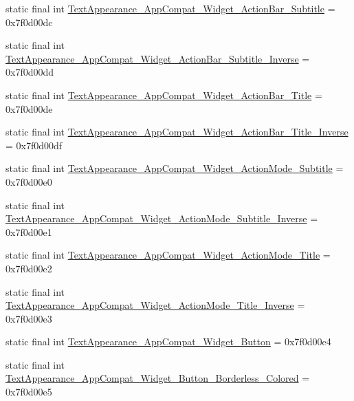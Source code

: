 \begin{DoxyCompactItemize}
\item 
static final int \mbox{\hyperlink{classcom_1_1synnapps_1_1carouselview_1_1_r_1_1style_ac478ef0d31921a8cc947a0f3a59801e9}{Text\+Appearance\+\_\+\+App\+Compat\+\_\+\+Widget\+\_\+\+Action\+Bar\+\_\+\+Subtitle}} = 0x7f0d00dc
\item 
static final int \mbox{\hyperlink{classcom_1_1synnapps_1_1carouselview_1_1_r_1_1style_a7c046efd65a9cc7f688b28b44965d379}{Text\+Appearance\+\_\+\+App\+Compat\+\_\+\+Widget\+\_\+\+Action\+Bar\+\_\+\+Subtitle\+\_\+\+Inverse}} = 0x7f0d00dd
\item 
static final int \mbox{\hyperlink{classcom_1_1synnapps_1_1carouselview_1_1_r_1_1style_aea731093db22a41c05557a92245e38da}{Text\+Appearance\+\_\+\+App\+Compat\+\_\+\+Widget\+\_\+\+Action\+Bar\+\_\+\+Title}} = 0x7f0d00de
\item 
static final int \mbox{\hyperlink{classcom_1_1synnapps_1_1carouselview_1_1_r_1_1style_acdf3700f01f15c2fa69eba8274ca4ddc}{Text\+Appearance\+\_\+\+App\+Compat\+\_\+\+Widget\+\_\+\+Action\+Bar\+\_\+\+Title\+\_\+\+Inverse}} = 0x7f0d00df
\item 
static final int \mbox{\hyperlink{classcom_1_1synnapps_1_1carouselview_1_1_r_1_1style_a26d729b52cd8de7d6be03cf5c871b596}{Text\+Appearance\+\_\+\+App\+Compat\+\_\+\+Widget\+\_\+\+Action\+Mode\+\_\+\+Subtitle}} = 0x7f0d00e0
\item 
static final int \mbox{\hyperlink{classcom_1_1synnapps_1_1carouselview_1_1_r_1_1style_aad1fddb42d3a1192358a730c165ecd9a}{Text\+Appearance\+\_\+\+App\+Compat\+\_\+\+Widget\+\_\+\+Action\+Mode\+\_\+\+Subtitle\+\_\+\+Inverse}} = 0x7f0d00e1
\item 
static final int \mbox{\hyperlink{classcom_1_1synnapps_1_1carouselview_1_1_r_1_1style_a05de7455115b9ea52ac5d04ae20deff5}{Text\+Appearance\+\_\+\+App\+Compat\+\_\+\+Widget\+\_\+\+Action\+Mode\+\_\+\+Title}} = 0x7f0d00e2
\item 
static final int \mbox{\hyperlink{classcom_1_1synnapps_1_1carouselview_1_1_r_1_1style_a88bd9bab8076bad40f3ac78d989357d1}{Text\+Appearance\+\_\+\+App\+Compat\+\_\+\+Widget\+\_\+\+Action\+Mode\+\_\+\+Title\+\_\+\+Inverse}} = 0x7f0d00e3
\item 
static final int \mbox{\hyperlink{classcom_1_1synnapps_1_1carouselview_1_1_r_1_1style_a4a0f343f1495d2e7089e572413620169}{Text\+Appearance\+\_\+\+App\+Compat\+\_\+\+Widget\+\_\+\+Button}} = 0x7f0d00e4
\item 
static final int \mbox{\hyperlink{classcom_1_1synnapps_1_1carouselview_1_1_r_1_1style_a1cdd158f96b31d3c932643b63540651d}{Text\+Appearance\+\_\+\+App\+Compat\+\_\+\+Widget\+\_\+\+Button\+\_\+\+Borderless\+\_\+\+Colored}} = 0x7f0d00e5

\end{DoxyCompactItemize}
